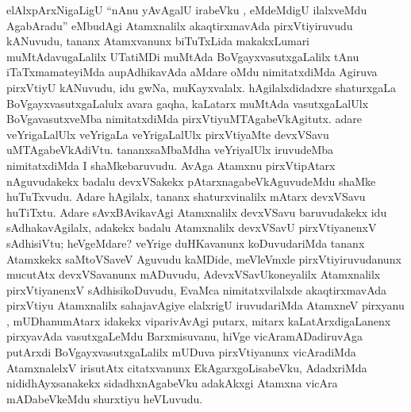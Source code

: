 \centerline{}

\begin{artha}
elAlxpArxNigaLigU ``nAnu yAvAgalU irabeVku , eMdeMdigU ilalxveMdu AgabAradu'' 
eMbudAgi Atamxnalilx akaqtirxmavAda pirxVtiyiruvudu kANuvudu, tananx
Atamxvanunx biTuTxLida makakxLumari muMtAdavugaLalilx UTatiMDi muMtAda
BoVgayxvasutxgaLalilx tAnu iTaTxmamateyiMda aupAdhikavAda aMdare oMdu
nimitatx\-diMda Agiruva pirxVtiyU kANuvudu, idu gwNa,
muKayxvalalx. hAgilalxdidadxre shaturxgaLa BoVgayxvasutxgaLalulx avara
gaqha, kaLatarx muMtAda vasutxgaLalUlx BoVgavasutx\-veMba nimitatxdiMda
pirxVtiyuMTAgabeVkAgitutx. adare veYrigaLalUlx veYrigaLa veYrigaLalUlx
pirxVtiyaMte devxVSavu uMTAgabeVkAdiVtu. tananxsaMbaMdha veYriyalUlx
iruvudeMba nimitatxdiMda I shaMkebaruvudu. AvAga Atamxnu pirxVtipAtarx
nAguvudakekx badalu devxVSakekx pAtarxnagabeVkAguvudeMdu shaMke
huTuTxvudu. Adare hAgilalx, tananx shaturxvinalilx mAtarx devxVSavu
huTiTxtu. Adare sAvxBAvikavAgi Atamxnalilx devxVSavu baruvudakekx idu
sAdhakavAgilalx, adakekx badalu Atamxnalilx devxVSavU pirxVtiyanenxV
sAdhisiVtu; heVgeMdare? veYrige duHKavanunx koDuvudariMda tananx
Atamxkekx saMtoVSaveV Aguvudu kaMDide, meVleVmxle pirxVtiyiruvudanunx
mucutAtx devxVSavanunx mADuvudu, AdevxVSavUkoneyalilx Atamxnalilx
pirxVtiyanenxV sAdhisikoDuvudu, EvaMca nimitatxvilalxde akaqtirxmavAda
pirxVtiyu Atamxnalilx sahajavAgiye elalxrigU iruvudariMda AtamxneV
pirxyanu , mUDhanumAtarx idakekx viparivAvAgi putarx, mitarx
kaLatArxdigaLanenx pirxyavAda vasutxgaLeMdu Barxmisuvanu, hiVge
vicAramADadiruvAga putArxdi BoVgayxvasutxgaLalilx mUDuva pirxVtiyanunx
vicAradiMda AtamxnalelxV irisutAtx citatxvanunx EkAgarxgoLisabeVku,
AdadxriMda nididhAyxsanakekx sidadhxnAgabeVku adakAkxgi Atamxna vicAra mADabeVkeMdu shurxtiyu heVLuvudu.
\end{artha}

